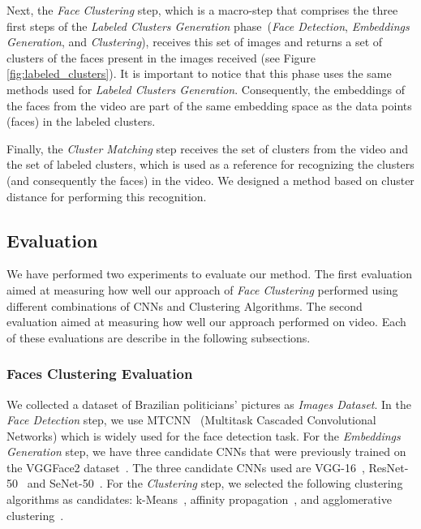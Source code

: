 Next, the \textit{Face Clustering} step, which is a macro-step that comprises the three first steps of the \emph{Labeled Clusters Generation} phase~(\emph{Face Detection}, \emph{Embeddings Generation}, and \emph{Clustering}), receives this set of images and returns a set of clusters of the faces present in the images received  (see Figure \ref{fig:labeled_clusters}).
It is important to notice that this phase uses the same methods used for \emph{Labeled Clusters Generation}.
Consequently, the embeddings of the faces from the video are part of the same embedding space as the data points (faces) in the labeled clusters.

Finally, the \textit{Cluster Matching} step receives the set of clusters from the video and the set of labeled clusters, which is used as a reference for recognizing the clusters (and consequently the faces) in the video.
We designed a method based on cluster distance for performing this recognition.

\subsection{Evaluation}

We have performed two experiments to evaluate our method. 
The first evaluation aimed at measuring how well our approach of \emph{Face Clustering} performed using different combinations of CNNs and Clustering Algorithms. 
The second evaluation aimed at measuring how well our approach performed on video. Each of these evaluations are describe in the following subsections.

\subsubsection{Faces Clustering Evaluation}
\label{faces_clustering_evaluation}
We collected a dataset of Brazilian politicians' pictures as \emph{Images Dataset}.
In the \emph{Face Detection} step, we use MTCNN~\cite{mtcnn} (Multitask
Cascaded Convolutional Networks) which is widely used for the face detection task.
For the \emph{Embeddings Generation} step, we have three candidate CNNs that were previously trained on the VGGFace2 dataset~\cite{cao2018vggface2}. The three candidate CNNs used are VGG-16~\cite{vgg16}, ResNet-50~\cite{resnet} and SeNet-50~\cite{senet}. 
For the \emph{Clustering} step, we selected the following clustering algorithms as candidates: k-Means~\cite{lloyd1982least}, affinity propagation~\cite{frey2007clustering}, and agglomerative clustering~\cite{ward1963hierarchical}.

